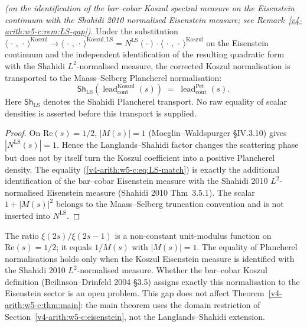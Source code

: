 \begin{proposition}
\label{v4-arith:w5-c:prop:LS-absorption}
\emph{(on the identification of the bar--cobar
Koszul spectral measure on the Eisenstein continuum with the Shahidi
2010 normalised Eisenstein measure; see Remark~\ref{v4-arith:w5-c:rem:LS-gap})}. Under the substitution
\(\langle\,\cdot\,,\,\cdot\,\rangle^{\mathrm{Koszul}}\to\langle\,\cdot\,,\,\cdot\,\rangle^{\mathrm{Koszul},\mathrm{LS}}=N^{\mathrm{LS}}(\cdot)\cdot\langle\,\cdot\,,\,\cdot\,\rangle^{\mathrm{Koszul}}\)
on the Eisenstein continuum and the independent identification of the
resulting quadratic form with the Shahidi \(L^{2}\)-normalised measure,
the corrected Koszul normalisation is transported to the
Maass--Selberg Plancherel normalisation:
\begin{equation}
\label{v4-arith:w5-c:eq:LS-match}
\mathsf{Sh}_{\mathrm{LS}}\!\left(\operatorname{lead}^{\mathrm{Koszul}}_{\mathrm{cont}}(s)\right)
\;=\;\operatorname{lead}^{\mathrm{Pet}}_{\mathrm{cont}}(s).
\end{equation}
Here \(\mathsf{Sh}_{\mathrm{LS}}\) denotes the Shahidi Plancherel
transport. No raw equality of scalar densities is asserted before this
transport is supplied.
\end{proposition}

\begin{proof}
On \(\mathrm{Re}(s)=1/2\), \(|M(s)|=1\) (Moeglin--Waldspurger \S IV.3.10)
gives \(|N^{\mathrm{LS}}(s)|=1\). Hence the Langlands--Shahidi factor
changes the scattering phase but does not by itself turn the Koszul
coefficient into a positive Plancherel density. The equality
(\ref{v4-arith:w5-c:eq:LS-match}) is exactly the additional
identification of the bar--cobar Eisenstein measure with the Shahidi
2010 \(L^{2}\)-normalised Eisenstein measure (Shahidi 2010
Thm~3.5.1). The scalar \(1+|M(s)|^{2}\) belongs to the
Maass--Selberg truncation convention and is not inserted into
\(N^{\mathrm{LS}}\).
\end{proof}

\begin{remark}
\label{v4-arith:w5-c:rem:LS-gap}
The ratio \(\xi(2s)/\xi(2s-1)\) is a non-constant unit-modulus function
on \(\mathrm{Re}(s)=1/2\); it equals \(1/M(s)\) with \(|M(s)|=1\).
The equality of Plancherel normalisations holds only when the Koszul
Eisenstein measure is identified with the Shahidi 2010
\(L^{2}\)-normalised measure. Whether the bar--cobar Koszul definition
(Beilinson--Drinfeld 2004 \S3.5) assigns exactly this normalisation to
the Eisenstein sector is an open problem. This gap does not affect
Theorem~\ref{v4-arith:w5-c:thm:main}: the main theorem uses the domain
restriction of Section~\ref{v4-arith:w5-c:eisenstein}, not the
Langlands--Shahidi extension.
\end{remark}

